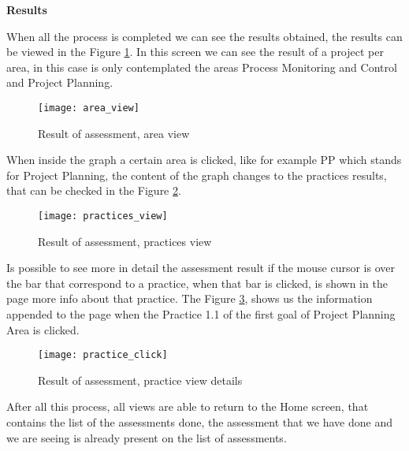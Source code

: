 \vspace{10 mm}

\textbf{Results}

When all the process is completed we can see the results obtained, the results can be viewed in the Figure \ref{fig:area_view}. In this screen we can see the result of a project per area, in this case is only contemplated the areas Process Monitoring and Control and Project Planning.

\begin{figure}[h]
	\begin{center}
		\leavevmode
		\texttt{[image: area\_view]}
		\caption{Result of assessment, area view}
		\label{fig:area_view}
	\end{center}
\end{figure}

When inside the graph a certain area is clicked, like for example PP which stands for Project Planning, the content of the graph changes to the practices results, that can be checked in the Figure \ref{fig:practices_view}.


\begin{figure}[h]
	\begin{center}
		\leavevmode
		\texttt{[image: practices\_view]}
		\caption{Result of assessment, practices view}
		\label{fig:practices_view}
	\end{center}
\end{figure}

Is possible to see more in detail the assessment result if the mouse cursor is over the bar that correspond to a practice, when that bar is clicked, is shown in the page more info about that practice. The Figure \ref{fig:practice_click}, shows us the information appended to the page when the Practice 1.1 of the first goal of Project Planning Area is clicked.

\begin{figure}[h]
	\begin{center}
		\leavevmode
		\texttt{[image: practice\_click]}
		\caption{Result of assessment, practice view details}
		\label{fig:practice_click}
	\end{center}
\end{figure}

After all this process, all views are able to return to the Home screen, that contains the list of the assessments done, the assessment that we have done and we are seeing is already present on the list of assessments.

